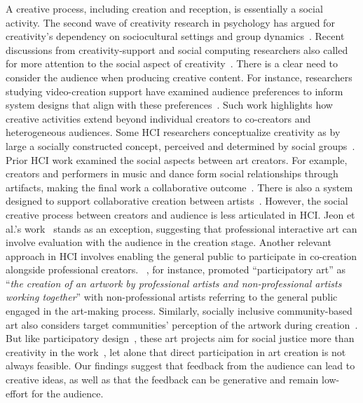 A creative process, including creation and reception, is essentially a social activity. The second wave of creativity research in psychology has argued for creativity's dependency on sociocultural settings and group dynamics~\cite{sawyer2024explaining}. Recent discussions from creativity-support and social computing researchers also called for more attention to the social aspect of creativity~\cite{kato2023special, fischer2005beyond, fischer2009creativity}. There is a clear need to consider the audience when producing creative content. For instance, researchers studying video-creation support have examined audience preferences to inform system designs that align with these preferences~\cite{wang2024podreels}. Such work highlights how creative activities extend beyond individual creators to co-creators and heterogeneous audiences. Some HCI researchers conceptualize creativity as by large a socially constructed concept, perceived and determined by social groups~\cite{fischer2009creativity}. 
Prior HCI work examined the social aspects between art creators. For example, creators and performers in music and dance form social relationships through artifacts, making the final work a collaborative outcome~\cite{hsueh2019deconstructing}. There is also a system designed to support collaborative creation between artists~\cite{striner2022co}. However, the social creative process between creators and audience is less articulated in HCI. Jeon et al.'s work~\cite{jeon2019rituals} stands as an exception, suggesting that professional interactive art can involve evaluation with the audience in the creation stage. 
Another relevant approach in HCI involves enabling the general public to participate in co-creation alongside professional creators. ~\citet{matarasso2019restless}, for instance, promoted ``participatory art'' as ``\textit{the creation of an artwork by professional artists and non-professional artists working together}'' with non-professional artists referring to the general public engaged in the art-making process. Similarly, socially inclusive community-based art also considers target communities' perception of the artwork during creation~\cite{clark2016situated, clarke2014socially}. But like participatory design~\cite{schuler1993participatory}, these art projects aim for social justice more than creativity in the work~\cite{murray2024designing}, let alone that direct participation in art creation is not always feasible. Our findings suggest that feedback from the audience can lead to creative ideas, as well as that the feedback can be generative and remain low-effort for the audience.

